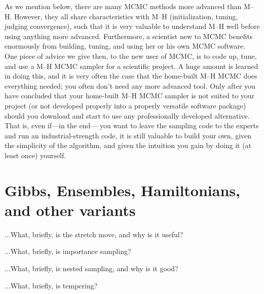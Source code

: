 \documentclass[12pt,twoside,pdftex]{article}
\begin{document}
As we mention below,
  there are many MCMC methods more advanced than M--H.
However, they all share characteristics with M--H
  (initialization, tuning, judging convergence),
  such that it is very valuable to understand M--H well before using anything more advanced.
Furthermore, a scientist new to MCMC benefits enormously from
  building, tuning, and using her or his own MCMC software.
One piece of advice we give then,
  to the new user of MCMC,
  is to code up, tune, and use a M--H MCMC sampler for a scientific project.
A huge amount is learned in doing this,
  and it is very often the case that the home-built M--H MCMC does everything needed;
  you often don't need any more advanced tool.
Only after you have concluded that your home-built M--H MCMC sampler
  is not suited to your project
  (or not developed properly into a properly versatile software package)
  should you download and start to use any professionally developed alternative.
That is, even if---in the end---%
  you want to leave the sampling code to the experts and run an industrial-strength code,
  it is still valuable to build your own,
  given the simplicity of the algorithm,
  and given the intuition you gain by doing it (at least once) yourself.

\section{Gibbs, Ensembles, Hamiltonians, and other variants}

%
%


...What, briefly, is the stretch move, and why is it useful?

...What, briefly, is importance sampling?

...What, briefly, is nested sampling, and why is it good?

...What, briefly, is tempering?
\end{document}
